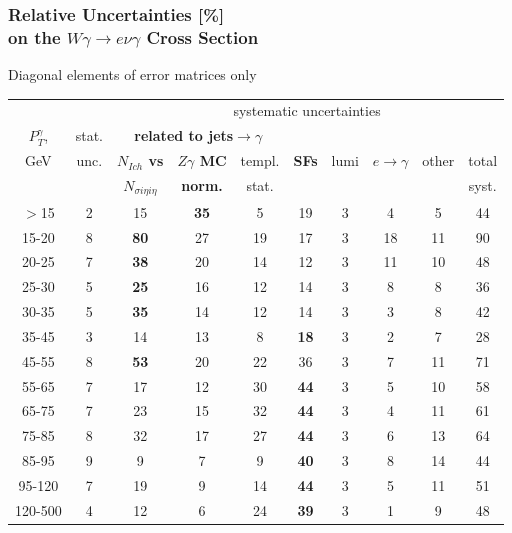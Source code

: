 \begin{frame}\frametitle{Relative Uncertainties [\%]\\
  on the $W\gamma\rightarrow e\nu\gamma$ Cross Section}
\footnotesize
Diagonal elements of error matrices only
\begin{table}[h]
  \tiny
  \begin{center}
   \begin{tabular}{|c|c|c|c|c|c|c|c|c|c|}
   \hline
                  &       & \multicolumn{8}{|c|}{systematic uncertainties}     \\
    $P_T^{\gamma}$, & stat. & \multicolumn{3}{|c|}{\color{blue}\bfseries{related to jets$\rightarrow\gamma$}} &  &  &  &  & \\
    GeV           & unc.  & {\color{blue}\bfseries{$N_{Ich}$ vs}}          &{\color{blue}\bfseries{$Z\gamma$ MC}} & templ. & {\color{blue}\bfseries{SFs}} & lumi &$e\rightarrow\gamma$ & other & total\\ 
                  &       & {\color{blue}\bfseries{$N_{\sigma{i\eta i\eta}}$}} & {\color{blue}\bfseries{norm.}}       & stat.  &  &  & &  & syst.\\ \hline
    $>$15  & 2 & 15 & {\color{blue}\bfseries{35}} & 5 & 19 & 3 & 4 & 5 & 44 \\ \hline
    15-20 & 8 & {\color{blue}\bfseries{80}} & 27 & 19 & 17 & 3 & 18 & 11 & 90 \\ \hline
    20-25 & 7 & {\color{blue}\bfseries{38}} & 20 & 14 & 12 & 3 & 11 & 10 & 48 \\ \hline
    25-30 & 5 & {\color{blue}\bfseries{25}} & 16 & 12 & 14 & 3 & 8 & 8 & 36 \\ \hline
    30-35 & 5 & {\color{blue}\bfseries{35}} & 14 & 12 & 14 & 3 & 3 & 8 & 42 \\ \hline
    35-45 & 3 & 14 & 13 & 8 & {\color{blue}\bfseries{18}} & 3 & 2 & 7 & 28 \\ \hline
    45-55 & 8 & {\color{blue}\bfseries{53}} & 20 & 22 & 36 & 3 & 7 & 11 & 71 \\ \hline
    55-65 & 7 & 17 & 12 & 30 & {\color{blue}\bfseries{44}} & 3 & 5 & 10 & 58 \\ \hline
    65-75 & 7 & 23 & 15 & 32 & {\color{blue}\bfseries{44}} & 3 & 4 & 11 & 61 \\ \hline
    75-85 & 8 & 32 & 17 & 27 & {\color{blue}\bfseries{44}} & 3 & 6 & 13 & 64 \\ \hline
    85-95 & 9 & 9 & 7 & 9 & {\color{blue}\bfseries{40}} & 3 & 8 & 14 & 44 \\ \hline
    95-120 & 7 & 19 & 9 & 14 & {\color{blue}\bfseries{44}} & 3 & 5 & 11 & 51 \\ \hline
    120-500 & 4 & 12 & 6 & 24 & {\color{blue}\bfseries{39}} & 3 & 1 & 9 & 48 \\ \hline
  \end{tabular}
  \label{tab:systInPercent_ELECTRON_WGamma}
  \end{center}
\end{table}
\end{frame}%

